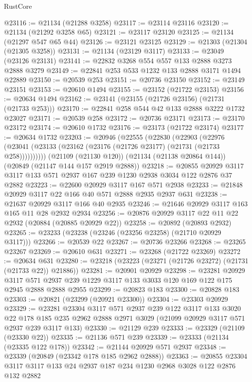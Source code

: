 \begin{lexlean}{RustCore}
\begin{coremodule}
@23116 := @21134 (@21288 @3258)
@23117 := @23114 @23116
@23120 := @21134 (@21292 @3258 @65)
@23121 := @23117 @23120
@23125 := @21134 (@21297 @547 @65 @44)
@23126 := @23121 @23125
@23129 := @21303 (@21304 (@21305 @3258))
@23131 := @21134 (@23129 @3117)
@23133 := @23049 (@23126 @23131)
@23141 := @22832 @3268 @554 @557 @133 @2888 @3273 @2888 @3279
@23149 := @22841 @253 @533 @1232 @133 @2888 @3171 @1494 @22889
@23150 := @20539 @253
@23151 := @20736 @23150
@23152 := @23149 @23151
@23153 := @20610 @1494
@23155 := @23152 (@21722 @23153)
@23156 := @20634 @1494
@23162 := @23141 (@23155 (@21726 @23156) (@21731 (@21733 @253)))
@23170 := @22841 @258 @544 @42 @133 @2888 @3222 @1732 @23027
@23171 := @20539 @258
@23172 := @20736 @23171
@23173 := @23170 @23172
@23174 := @20610 @1732
@23176 := @23173 (@21722 @23174)
@23177 := @20634 @1732
@23203 := @20946
    (@22555
      (@22830
        (@22903
          (@22976 (@23041 (@23133 (@23162 (@23176 (@21726 @23177) (@21731 (@21733 @258))))))))))
    (@21109 (@21130 @120))
    (@21134 (@21138 @20864 @144))
    (@20849 (@21147 @144 @157 @2919 @2888))
@23218 := @20855 @20929 @3117 @3117 @133 @571 @2937 @167 @239 @1230 @2938 @3034 @122 @2876 @37 @2882
@23223 := @22600 @20929 @3117 @167 @571 @2938
@23233 := @21848 @20929 @3117 @22 @166 @40 @571 @2888 @2935 @2937 @631
@23238 := @21637 @20929 @3117 @166 @40 @2935
@23246 := @21646 @20929 @3117 @163 @165 @11 @28 @2932 @2934
@23256 := @20876 @20929 @3117 @22 @11 @22 @2932 (@20884 (@20885 @20929 @22))
@23258 := @20892 (@20893 @2932)
@23265 := @23233 (@23238 (@23246 (@23256 @23258) (@21710 @20929 @3117)))
@23266 := @20539 @22
@23267 := @20736 @23266
@23268 := @23265 @23267
@23269 := @20610 @631
@23271 := @23268 (@21722 @23269)
@23272 := @20634 @631
@23280 := @23218 (@23223 (@23271 (@21726 @23272) (@21731 (@21733 @22)) @21886))
@23281 := @20901 @20929
@23298 := @23281
    @20929
    @3117
    @571
    @2937
    @239
    @1229
    @3117
    @133
    @3033
    @120
    @169
    @122
    @175
    @2945
    @2888
    @2888
    @2955
@23299 := @20823 @183
@23300 := @20828 @183
@23303 := @20821 (@23299 (@20921 @23300))
@23304 := @23303 @20929
@23329 := @23281
    @23304
    @3117
    @571
    @2937
    @239
    @122
    @3117
    @133
    @3020
    @22
    @178
    @185
    @235
    @2962
    @2888
    @2971
    @3029
    (@21099 @20929 @3117 @571 @2937 @239 @3117 @133)
@23330 := @21129 @239
@23333 := @23329 (@21109 (@23330 @22))
@23335 := @21136 @571 @239
@23339 := @23333 (@21134 (@23335 @122 @178))
@23342 := @21144 @20929 @571 @2937
@23348 := @23339 (@20849 (@23342 @178 @185 @2962 @2888))
@23363 := @20855 @23304 @3117 @3117 @133 @24 @2937 @187 @234 @1230 @2968 @3028 @122 @2876 @132 @2882

\end{coremodule}
\end{lexlean}
